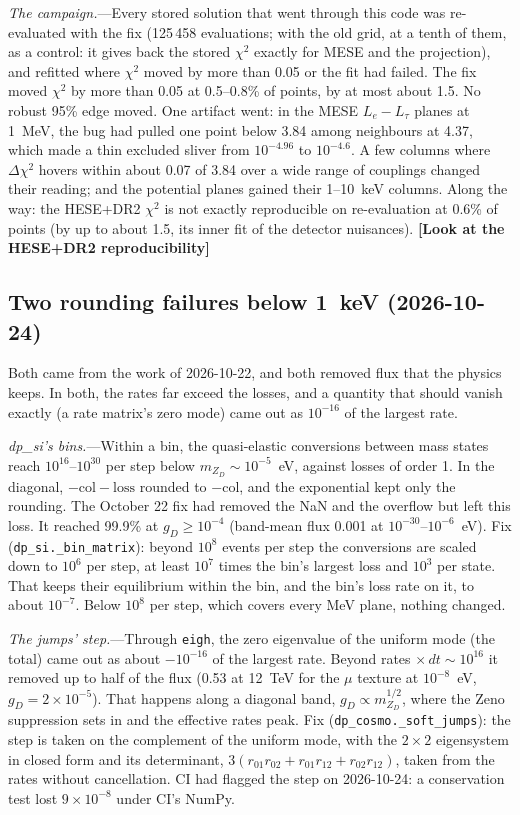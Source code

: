 \documentclass[11pt,a4paper]{article}
\newcommand{\note}[1]{\textbf{[#1]}}
\newcommand{\file}[1]{\nolinkurl{#1}}
\newcommand{\mzd}{m_{Z_D}}
\newcommand{\gd}{g_D}
\begin{document}
\textit{The campaign.}---Every stored solution that went through this code was re-evaluated with the
fix (125\,458 evaluations; with the old grid, at a tenth of them, as a control: it gives back the stored
$\chi^2$ exactly for MESE and the projection), and refitted where $\chi^2$ moved by more than 0.05 or
the fit had failed. The fix moved $\chi^2$ by more than 0.05 at 0.5--0.8\% of points, by at most about
1.5. No robust 95\% edge moved. One artifact went: in the MESE $L_e - L_\tau$ planes at 1~MeV, the bug had
pulled one point below 3.84 among neighbours at 4.37, which made a thin excluded sliver from
$10^{-4.96}$ to $10^{-4.6}$. A few columns where $\Delta\chi^2$ hovers within about 0.07 of 3.84 over a
wide range of couplings changed their reading; and the potential planes gained their 1--10~keV columns.
Along the way: the HESE+DR2 $\chi^2$ is not exactly reproducible on re-evaluation at 0.6\% of points
(by up to about 1.5, its inner fit of the detector nuisances). \note{Look at the HESE+DR2 reproducibility}

\subsection{Two rounding failures below 1~keV (2026-10-24)}
\label{sec:rounding-subkev}

Both came from the work of 2026-10-22, and both removed flux that the physics keeps. In both, the rates far exceed
the losses, and a quantity that should vanish exactly (a rate matrix's zero mode) came out as $10^{-16}$ of the
largest rate.

\textit{dp\_si's bins.}---Within a bin, the quasi-elastic conversions between mass states reach $10^{16}$--$10^{30}$
per step below $\mzd\sim10^{-5}$~eV, against losses of order 1. In the diagonal, $-\text{col} - \text{loss}$ rounded
to $-\text{col}$, and the exponential kept only the rounding. The October 22 fix had removed the NaN and the
overflow but left this loss. It reached 99.9\% at $\gd \ge 10^{-4}$ (band-mean flux 0.001 at
$10^{-30}$--$10^{-6}$~eV). Fix (\file{dp\_si.\_bin\_matrix}): beyond $10^{8}$ events per step the conversions are
scaled down to $10^{6}$ per step, at least $10^{7}$ times the bin's largest loss and $10^{3}$ per state. That keeps
their equilibrium within the bin, and the bin's loss rate on it, to about $10^{-7}$. Below $10^{8}$ per step, which
covers every MeV plane, nothing changed.

\textit{The jumps' step.}---Through \texttt{eigh}, the zero eigenvalue of the uniform mode (the total) came out as
about $-10^{-16}$ of the largest rate. Beyond rates $\times\,dt \sim 10^{16}$ it removed up to half of the flux
(0.53 at 12~TeV for the $\mu$ texture at $10^{-8}$~eV, $\gd = 2\times10^{-5}$). That happens along a diagonal band,
$\gd \propto \mzd^{1/2}$, where the Zeno suppression sets in and the effective rates peak. Fix
(\file{dp\_cosmo.\_soft\_jumps}): the step is taken on the complement of the uniform mode, with the $2\times2$
eigensystem in closed form and its determinant, $3(r_{01}r_{02} + r_{01}r_{12} + r_{02}r_{12})$, taken from the
rates without cancellation. CI had flagged the step on 2026-10-24: a conservation test lost $9\times10^{-8}$ under
CI's NumPy.
\end{document}
